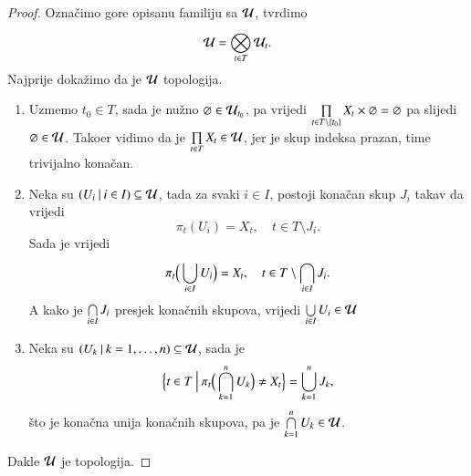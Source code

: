 \begin{proof}
    Ozna\v cimo gore opisanu familiju sa $\mathcal{U}$, tvrdimo
    \begin{equation*}
        \mathcal{U} = \bigotimes\limits_{t \in T}^{} \mathcal{U}_t.
    \end{equation*}
    Najprije doka\v zimo da je $\mathcal{U}$ topologija.
    \begin{enumerate}[label=(\roman*)]
        \item Uzmemo $t_0 \in T$, sada je nu\v zno $\varnothing \in \mathcal{U}_{t_0}$, pa vrijedi $\prod\limits_{t \in T \setminus \{t_0\}}^{} X_t \times \varnothing = \varnothing$ pa slijedi $\varnothing \in \mathcal{U}$.
        Tako\dj er vidimo da je $\prod\limits_{t \in T}^{} X_t \in \mathcal{U}$, jer je skup indeksa prazan, time trivijalno kona\v can.
        \item Neka su $({U_i} \: | \: {i \in I}) \subseteq \mathcal{U}$, tada za svaki $i \in I$, postoji kona\v can skup $J_i$ takav da vrijedi
        \begin{equation*}
            \pi_t (U_i) = X_t, \quad t \in T \setminus J_i.
        \end{equation*}
        Sada je vrijedi
        \begin{equation*}
            \pi_t \Big(\bigcup\limits_{i \in I}^{} U_i \Big) = X_t, \quad t \in T \setminus \bigcap\limits_{i \in I}^{} J_i.
        \end{equation*}
        A kako je $\bigcap\limits_{i \in I}^{} J_i$ presjek kona\v cnih skupova, vrijedi $\bigcup\limits_{i \in I}^{} U_i \in \mathcal{U}$
        \item Neka su $({U_k} \: | \: {k = 1, \ldots, n}) \subseteq \mathcal{U}$, sada je
        \begin{equation*}
            \Big\{ {t \in T} \: \Big| \: {\pi_t \Big( \bigcap\limits_{k = 1}^{n} U_k \Big) \neq X_t} \Big\} = \bigcup\limits_{k = 1}^{n} J_k,
        \end{equation*}
        \v sto je kona\v cna unija kona\v cnih skupova, pa je $\bigcap\limits_{k = 1}^{n} U_k \in \mathcal{U}$.
    \end{enumerate}
    Dakle $\mathcal{U}$ je topologija.


\end{proof}
